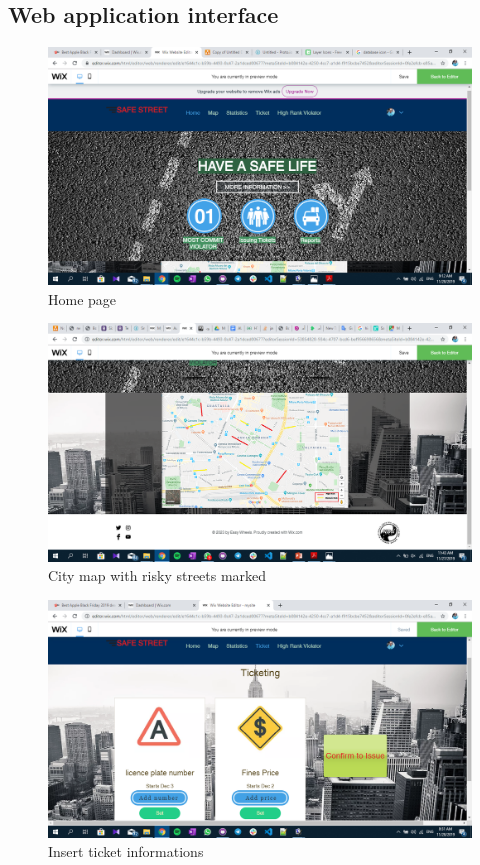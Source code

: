 \documentclass{article}
\begin{document}
	\subsection{Web application interface}
		\label{fig:homepage}
		\begin{figure}[H]
			\includegraphics[width=\linewidth]{images/home.png}
			\caption{Home page}
		\end{figure}
		\begin{figure}[H]
			\includegraphics[width=\linewidth]{images/map.png}
			\caption{City map with risky streets marked}
		\end{figure}
		\begin{figure}[H]
			\includegraphics[width=\linewidth]{images/ticketing.png}
			\caption{Insert ticket informations}
		\end{figure}
\end{document}
